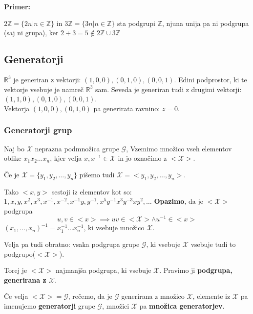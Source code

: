 \documentclass[a4paper]{article}
\newcounter{environment:definition_counter}
\newcounter{environment:theorem_counter}
\newcounter{environment:statement_counter}
\newcounter{example:example_counter}
\newenvironment{example}
{\textbf{Primer:}\\}
{\setcounter{example:example_counter}{0}}
\newenvironment{example_case}
{\refstepcounter{example:example_counter} \arabic{example:example_counter}.}
{\\}
\begin{document}
\begin{example}
\begin{example_case}
$2\mathbb{Z} = \{2n | n \in \mathbb{Z}\}$ in $3\mathbb{Z} = \{3n | n \in \mathbb{Z}\}$ sta podgrupi $\mathbb{Z}$, njuna unija pa ni podgrupa (saj ni grupa), ker $2+3=5 \notin 2\mathbb{Z} \cup 3\mathbb{Z}$
\end{example_case}
\end{example}

\subsection{Generatorji}
$\mathbb{R}^3$ je generiran z vektorji: $(1,0,0), (0,1,0), (0,0,1)$. Edini podprostor, ki te vektorje vsebuje je namreč $\mathbb{R}^3$ sam. Seveda je generiran tudi z drugimi vektorji: $(1,1,0), (0,1,0), (0,0,1)$.\\
Vektorja $(1,0,0),(0,1,0)$ pa generirata ravnino: $z=0$.

\subsubsection{Generatorji grup}
Naj bo $\mathcal{X}$ neprazna podmnožica grupe $\mathcal{G}$, Vzemimo množico vseh elementov oblike $x_1 x_2 \dots x_n$, kjer velja $x, x^{-1} \in \mathcal{X}$ in jo označimo z $<\mathcal{X}>$.
 
Če je $\mathcal{X} = \{y_1, y_2, \dots , y_n\}$ pišemo tudi $\mathcal{X} = <y_1, y_2, \dots , y_n>$. 

Tako $<x,y>$ sestoji iz elementov kot so: $1, x, y, x^2, x^3, x^{-1}, x^{-2}, x^{-1}y, y^{-1}, x^5y^{-1}x^3y^{-3}xy^2, \dots$
\textbf{Opazimo}, da je $<\mathcal{X}>$ podgrupa
$$u,v \in <x> \implies uv \in <\mathcal{X}> \land u^{-1} \in <x>$$
$(x_1,\dots, x_n)^{-1} = x_{1}^{-1} \dots x_n^{-1}$, ki vsebuje množico $\mathcal{X}$.

Velja pa tudi obratno: vsaka podgrupa grupe $\mathcal{G}$, ki vsebuje $\mathcal{X}$ vsebuje tudi to podgrupo($<\mathcal{X}>$).

Torej je $<\mathcal{X}>$ najmanjša podgrupa, ki vsebuje $\mathcal{X}$. Pravimo ji \textbf{podgrupa, generirana z $\mathcal{X}$}.

Če velja $<\mathcal{X}> = \mathcal{G}$, rečemo, da je $\mathcal{G}$ generirana z množico $\mathcal{X}$, elemente iz $\mathcal{X}$ pa imenujemo \textbf{generatorji} grupe $\mathcal{G}$, množici $\mathcal{X}$ pa \textbf{množica generatorjev}.\\
\end{document}
